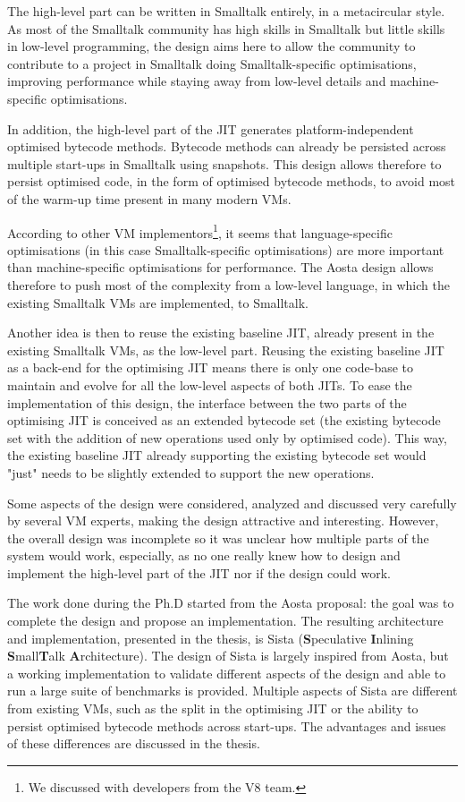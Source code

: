\documentclass[a4paper,12pt,twoside]{../includes/ThesisStyle}
\begin{document}
The high-level part can be written in Smalltalk entirely, in a metacircular style. As most of the Smalltalk community has high skills in Smalltalk but little skills in low-level programming, the design aims here to allow the community to contribute to a project in Smalltalk doing Smalltalk-specific optimisations, improving performance while staying away from low-level details and machine-specific optimisations. 

In addition, the high-level part of the JIT generates platform-independent optimised bytecode methods. Bytecode methods can already be persisted across multiple start-ups in Smalltalk using snapshots. This design allows therefore to persist optimised code, in the form of optimised bytecode methods, to avoid most of the warm-up time present in many modern VMs.

According to other VM implementors\footnote{We discussed with developers from the V8 team.}, it seems that language-specific optimisations (in this case Smalltalk-specific optimisations) are more important than machine-specific optimisations for performance. The Aosta design allows therefore to push most of the complexity from a low-level language, in which the existing Smalltalk VMs are implemented, to Smalltalk.

Another idea is then to reuse the existing baseline JIT, already present in the existing Smalltalk VMs, as the low-level part. Reusing the existing baseline JIT as a back-end for the optimising JIT means there is only one code-base to maintain and evolve for all the low-level aspects of both JITs. To ease the implementation of this design, the interface between the two parts of the optimising JIT is conceived as an extended bytecode set (the existing bytecode set with the addition of new operations used only by optimised code). This way, the existing baseline JIT already supporting the existing bytecode set would "just" needs to be slightly extended to support the new operations.

Some aspects of the design were considered, analyzed and discussed very carefully by several VM experts, making the design attractive and interesting. However, the overall design was incomplete so it was unclear how multiple parts of the system would work, especially, as no one really knew how to design and implement the high-level part of the JIT nor if the design could work.

The work done during the Ph.D started from the Aosta proposal: the goal was to complete the design and propose an implementation. The resulting architecture and implementation, presented in the thesis, is Sista (\textbf{S}peculative \textbf{I}nlining \textbf{S}mall\textbf{T}alk \textbf{A}rchitecture). The design of Sista is largely inspired from Aosta, but a working implementation to validate different aspects of the design and able to run a large suite of benchmarks is provided. Multiple aspects of Sista are different from existing VMs, such as the split in the optimising JIT or the ability to persist optimised bytecode methods across start-ups. The advantages and issues of these differences are discussed in the thesis.
\end{document}
